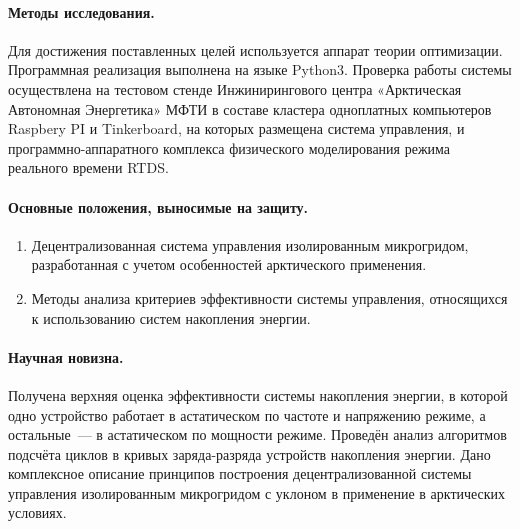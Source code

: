  \paragraph{Методы исследования.}
 Для достижения поставленных целей используется аппарат теории оптимизации.
 Программная реализация выполнена на языке Python3.
 Проверка работы системы осуществлена на тестовом стенде Инжинирингового центра «Арктическая Автономная Энергетика» МФТИ в составе кластера одноплатных компьютеров Raspbery PI и Tinkerboard, на которых размещена система управления, и программно-аппаратного комплекса физического моделирования режима реального времени RTDS.
 
 
 
 \paragraph{Основные положения, выносимые на защиту.}
 \begin{enumerate}
   \item Децентрализованная система управления изолированным микрогридом, разработанная с учетом особенностей арктического применения.
   \item Методы анализа критериев эффективности системы управления, относящихся к использованию систем накопления энергии.
 \end{enumerate}
 
 
 
 \paragraph{Научная новизна.}
Получена верхняя оценка эффективности системы накопления энергии, в которой одно устройство  работает в астатическом по частоте и напряжению режиме, а остальные~--- в астатическом по мощности режиме.
Проведён анализ алгоритмов подсчёта циклов в кривых заряда-разряда устройств накопления энергии.
Дано комплексное описание принципов построения децентрализованной системы управления изолированным микрогридом с уклоном в применение в арктических условиях.
 
 
 
